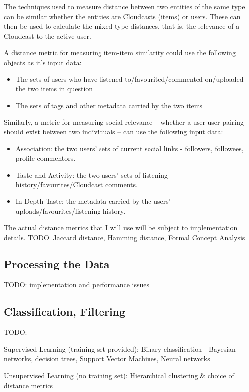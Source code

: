 The techniques used to measure distance between two entities of the same type can be similar whether the entities are Cloudcasts (items) or users. These can then be used to calculate the mixed-type distances, that is, the relevance of a Cloudcast to the active user.

A distance metric for measuring item-item similarity could use the following objects as it's input data: 
\begin{itemize}
 \item The sets of users who have listened to/favourited/commented on/uploaded the two items in question
 \item The sets of tags and other metadata carried by the two items 
\end{itemize}


Similarly, a metric for measuring social relevance -- whether a user-user pairing should exist between two individuals -- can use the following input data:
\begin{itemize}
 \item Association: the two users' sets of current social links - followers, followees, profile commentors. 
 \item Taste and Activity: the two users' sets of listening history/favourites/Cloudcast comments.
 \item In-Depth Taste: the metadata carried by the users' uploads/favourites/listening history.
\end{itemize}

The actual distance metrics that I will use will be subject to implementation details. TODO: Jaccard distance, Hamming distance, Formal Concept Analysis

\subsection*{Processing the Data}

TODO: implementation and performance issues

\subsection*{Classification, Filtering}

TODO:

Supervised Learning (training set provided): Binary classification - Bayesian networks, decision trees, Support Vector Machines, Neural networks

Unsupervised Learning (no training set): Hierarchical clustering \& choice of distance metrics


